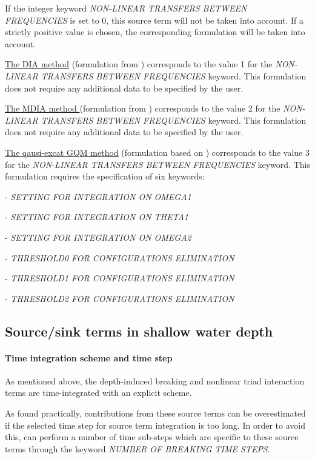  If the integer keyword \textit{NON-LINEAR TRANSFERS BETWEEN FREQUENCIES} is set to 0, this source term will not be taken into account. If a strictly positive value is chosen, the corresponding formulation will be taken into account.

 \underline{  The DIA method} (formulation from \cite{Hasselmann1985_1}) corresponds to the value 1 for the \textit{NON-LINEAR TRANSFERS BETWEEN FREQUENCIES} keyword. This formulation does not require any additional data to be specified by the user.

 \underline{The MDIA method }(formulation from \cite{Tolman2004}) corresponds to the value 2 for the \textit{NON-LINEAR TRANSFERS BETWEEN FREQUENCIES} keyword. This formulation does not require any additional data to be specified by the user.

 \underline{The qausi-excat GQM method} (formulation based on \cite{Lavrenov2001}) corresponds to the value 3 for the \textit{NON-LINEAR TRANSFERS BETWEEN FREQUENCIES} keyword. This formulation requires the specification of six keywords:

- \textit{SETTING FOR INTEGRATION ON OMEGA1}

- \textit{SETTING FOR INTEGRATION ON THETA1}

- \textit{SETTING FOR INTEGRATION ON OMEGA2}

- \textit{THRESHOLD0 FOR CONFIGURATIONS ELIMINATION}

- \textit{THRESHOLD1 FOR CONFIGURATIONS ELIMINATION}

- \textit{THRESHOLD2 FOR CONFIGURATIONS ELIMINATION}


\subsection{ Source/sink terms in shallow water depth}
\label{se:sourcshallow}

\paragraph{ Time integration scheme and time step}

 As mentioned above, the depth-induced breaking and nonlinear triad interaction terms are time-integrated with an explicit scheme.

 As found practically, contributions from these source terms can be overestimated if the selected time step for source term integration is too long. In order to avoid this, \tomawac can perform a number of time sub-steps which are specific to these source terms through the keyword \textit{NUMBER OF BREAKING TIME STEPS}.

